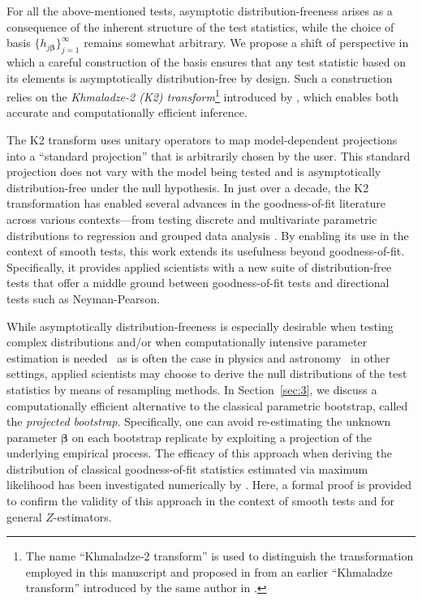 \documentclass[11pt]{article}
\newcommand{\vect}[1]{\boldsymbol{#1}}
\begin{document}
For all the above-mentioned tests, asymptotic distribution-freeness arises as a consequence of the inherent structure of the test statistics, while the choice of basis $\{h_{j\vect{\beta}}\}_{j=1}^\infty$ remains somewhat arbitrary. We propose a shift of perspective in which a careful construction of the basis ensures that any test statistic based on its elements is asymptotically distribution-free by design. Such a construction relies on the \textit{Khmaladze-2 (K2) transform}\footnote{The name
``Khmaladze-2 transform'' is used to distinguish the transformation employed in this manuscript and proposed in \citet{K22016} from an earlier ``Khmaladze transform'' introduced by the same author in \cite{gofk1}.}  introduced by \cite{K22016}, which enables both accurate and computationally efficient inference. 

The K2 transform uses unitary operators to map model-dependent projections into a ``standard projection'' that is arbitrarily chosen by the user. This standard projection does not vary with the model being tested and is asymptotically distribution-free under the null hypothesis.
In just over a decade, the K2 transformation has enabled several advances in the goodness-of-fit literature across various contexts---from testing discrete and multivariate parametric distributions \citep{khm13,K22016} to regression \citep{khm21,KHMALADZE2017348} and grouped data analysis \citep{sara2024}. By enabling its use in the context of smooth tests, this work extends its usefulness beyond goodness-of-fit. Specifically, it provides applied scientists with a new suite of distribution-free tests that offer a middle ground between goodness-of-fit tests and directional tests such as Neyman-Pearson.  


While asymptotically distribution-freeness is especially desirable when testing complex distributions and/or when computationally intensive parameter estimation is needed \textemdash \ as is often the case in physics and astronomy \citep[e.g.,][]{GAMBIT1,Cusin:2017mjm,Cusin:2019jpv, PRD,PRDL} \textemdash \ in other settings, applied scientists may choose to derive the null distributions of the test statistics by means of resampling methods. In Section~\ref{sec:3}, we discuss a computationally efficient alternative to the classical parametric bootstrap, called the \textit{projected bootstrap}. Specifically, one can avoid re-estimating the unknown parameter $\vect{\beta}$ on each bootstrap replicate by exploiting a projection of the underlying empirical process. The efficacy of this approach when deriving the distribution of classical goodness-of-fit statistics estimated via maximum likelihood has been investigated numerically by \cite{algeri2022k}. Here, a formal proof is provided to confirm the validity of this approach in the context of smooth tests and for general $Z$-estimators. %
\end{document}
